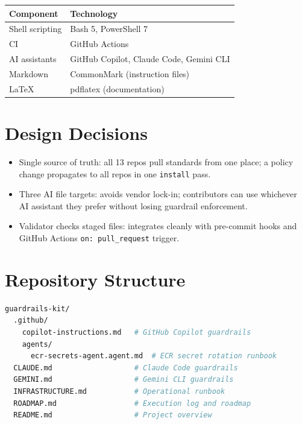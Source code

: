 \documentclass[11pt,a4paper]{article}
\begin{document}
\begin{tabular}{ll}
\toprule
\textbf{Component} & \textbf{Technology} \\
\midrule
Shell scripting & Bash 5, PowerShell 7 \\
CI & GitHub Actions \\
AI assistants & GitHub Copilot, Claude Code, Gemini CLI \\
Markdown & CommonMark (instruction files) \\
LaTeX & pdflatex (documentation) \\
\bottomrule
\end{tabular}


\section{Design Decisions}

\begin{itemize}
  \item Single source of truth: all 13 repos pull standards from one place;
    a policy change propagates to all repos in one \texttt{install} pass.
  \item Three AI file targets: avoids vendor lock-in; contributors can use
    whichever AI assistant they prefer without losing guardrail enforcement.
  \item Validator checks staged files: integrates cleanly with pre-commit hooks
    and GitHub Actions \texttt{on: pull\_request} trigger.
\end{itemize}


\section{Repository Structure}
\begin{lstlisting}[language=bash,caption={Top-level directory layout}]
guardrails-kit/
  .github/
    copilot-instructions.md   # GitHub Copilot guardrails
    agents/
      ecr-secrets-agent.agent.md  # ECR secret rotation runbook
  CLAUDE.md                   # Claude Code guardrails
  GEMINI.md                   # Gemini CLI guardrails
  INFRASTRUCTURE.md           # Operational runbook
  ROADMAP.md                  # Execution log and roadmap
  README.md                   # Project overview
\end{lstlisting}
\end{document}
